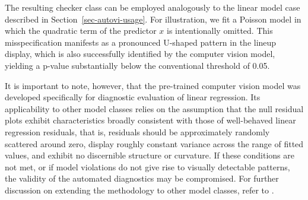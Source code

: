 \documentclass[
doublespace,
  times]{anzsauth}
\newenvironment{Shaded}{\begin{snugshade}}{\end{snugshade}}
\newcommand{\AttributeTok}[1]{\textcolor[rgb]{0.40,0.45,0.13}{#1}}
\newcommand{\ControlFlowTok}[1]{\textcolor[rgb]{0.00,0.23,0.31}{\textbf{#1}}}
\newcommand{\DecValTok}[1]{\textcolor[rgb]{0.68,0.00,0.00}{#1}}
\newcommand{\FunctionTok}[1]{\textcolor[rgb]{0.28,0.35,0.67}{#1}}
\newcommand{\NormalTok}[1]{\textcolor[rgb]{0.00,0.23,0.31}{#1}}
\newcommand{\OtherTok}[1]{\textcolor[rgb]{0.00,0.23,0.31}{#1}}
\newcommand{\SpecialCharTok}[1]{\textcolor[rgb]{0.37,0.37,0.37}{#1}}
\newcommand{\StringTok}[1]{\textcolor[rgb]{0.13,0.47,0.30}{#1}}
\begin{document}
\begin{Shaded}
\end{Shaded}

The resulting checker class can be employed analogously to the linear
model case described in Section~\ref{sec-autovi-usage}. For
illustration, we fit a Poisson model in which the quadratic term of the
predictor \(x\) is intentionally omitted. This misspecification
manifests as a pronounced U-shaped pattern in the lineup display, which
is also successfully identified by the computer vision model, yielding a
p-value substantially below the conventional threshold of 0.05.

It is important to note, however, that the pre-trained computer vision
model was developed specifically for diagnostic evaluation of linear
regression. Its applicability to other model classes relies on the
assumption that the null residual plots exhibit characteristics broadly
consistent with those of well-behaved linear regression residuals, that
is, residuals should be approximately randomly scattered around zero,
display roughly constant variance across the range of fitted values, and
exhibit no discernible structure or curvature. If these conditions are
not met, or if model violations do not give rise to visually detectable
patterns, the validity of the automated diagnostics may be compromised.
For further discussion on extending the methodology to other model
classes, refer to \citet{li2024automated}.
\end{document}
